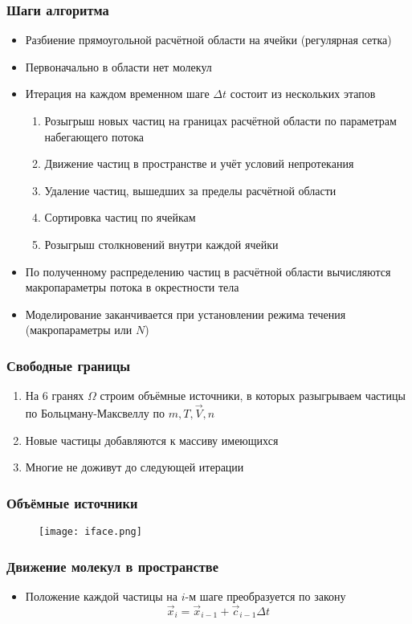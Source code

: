 \documentclass[onlymath]{beamer}
\begin{document}
\begin{frame}
  \frametitle{Шаги алгоритма}
  \begin{itemize}
  \item Разбиение прямоугольной расчётной области на ячейки (регулярная
    сетка)
  \item Первоначально в области нет молекул
  \item Итерация на каждом временном шаге $\Delta t$ состоит из
    нескольких этапов
    \begin{enumerate}
    \item Розыгрыш новых частиц на границах расчётной области по
      параметрам набегающего потока
    \item Движение частиц в пространстве и учёт условий непротекания
    \item Удаление частиц, вышедших за пределы расчётной области
    \item Сортировка частиц по ячейкам
    \item Розыгрыш столкновений внутри каждой ячейки
    \end{enumerate}
  \item По полученному распределению частиц в расчётной области
    вычисляются макропараметры потока в окрестности тела
  \item Моделирование заканчивается при установлении режима течения
    (макропараметры или $N$)
  \end{itemize}
\end{frame}

\begin{frame}
  \frametitle{Свободные границы}
  \begin{enumerate}
  \item На 6 гранях $\Omega$ строим объёмные источники, в которых
    разыгрываем частицы по Больцману-Максвеллу по $m, T, \vec{V}, n$
  \item Новые частицы добавляются к массиву имеющихся
  \item Многие не доживут до следующей итерации
  \end{enumerate}
\end{frame}

\begin{frame}
  \frametitle{Объёмные источники}
  \begin{figure}
    \centering
    \texttt{[image: iface.png]}
  \end{figure}  
\end{frame}

\begin{frame}
  \frametitle{Движение молекул в пространстве}
  \begin{itemize}
  \item Положение каждой частицы на $i$-м шаге преобразуется по закону
    \begin{equation*}
      \vec{x}_i = \vec{x}_{i-1} + \vec{c}_{i-1} \Delta t
    \end{equation*}
  \end{itemize}
\end{frame}
\end{document}
